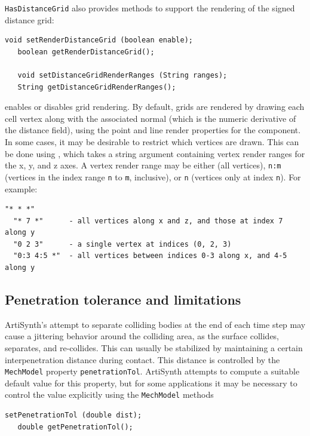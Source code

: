 {\tt HasDistanceGrid} also provides methods to support the rendering
of the signed distance grid:
%
\begin{lstlisting}[]
   void setRenderDistanceGrid (boolean enable);
   boolean getRenderDistanceGrid();

   void setDistanceGridRenderRanges (String ranges);
   String getDistanceGridRenderRanges();
\end{lstlisting}
%
enables or disables grid rendering. By default, grids are rendered by
drawing each cell vertex along with the associated normal (which is
the numeric derivative of the distance field), using the point and
line render properties for the component. In some cases, it may be
desirable to restrict which vertices are drawn. This can be done using
, which takes a string argument
containing vertex render ranges for the x, y, and z axes.  A vertex
render range may be either {\tt *} (all vertices), {\tt n:m} (vertices
in the index range {\tt n} to {\tt m}, inclusive), or {\tt n}
(vertices only at index {\tt n}). For example:
%
\begin{lstlisting}[]
  "* * *"      
  "* 7 *"      - all vertices along x and z, and those at index 7 along y
  "0 2 3"      - a single vertex at indices (0, 2, 3)
  "0:3 4:5 *"  - all vertices between indices 0-3 along x, and 4-5 along y
\end{lstlisting}
%

\subsection{Penetration tolerance and limitations}
\label{ContactLimitations:sec}

ArtiSynth's attempt to separate colliding bodies at the end of each
time step may cause a jittering behavior around the colliding area, as
the surface collides, separates, and re-collides.  This can usually be
stabilized by maintaining a certain interpenetration distance during
contact. This distance is controlled by the {\tt MechModel} property
{\tt penetrationTol}.  ArtiSynth attempts to compute a suitable
default value for this property, but for some applications it may be
necessary to control the value explicitly using the {\tt MechModel}
methods
%
\begin{lstlisting}[]
   setPenetrationTol (double dist);
   double getPenetrationTol();
\end{lstlisting}
%

